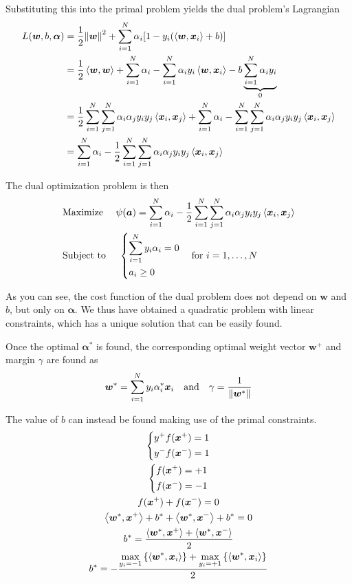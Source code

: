 \documentclass[oneside,onecolumn]{report}
\newcommand{\inp}[2]{\left\langle #1, #2 \right\rangle}
\begin{document}
Substituting this into the primal problem yields the dual problem's Lagrangian
\begin{align*}
    L(\bm w, b, \bm \alpha)
    &= \frac{1}{2} \norm{\bm w}^2 + \sum_{i = 1}^N \alpha_i [1 - y_i (\inp{\bm w}{\bm x_i} + b)] \\
    &= \frac{1}{2} \inp{\bm w}{\bm w} + \sum_{i = 1}^N \alpha_i - \sum_{i = 1}^N \alpha_i y_i \inp{\bm w}{\bm x_i} - b \underbrace{\sum_{i = 1}^N \alpha_i y_i}_0 \\
    &= \frac{1}{2} \sum_{i = 1}^N \sum_{j = 1}^N \alpha_i \alpha_j y_i y_j \inp{\bm x_i}{\bm x_j} + \sum_{i = 1}^N \alpha_i - \sum_{i = 1}^N \sum_{j = 1}^N \alpha_i \alpha_j y_i y_j \inp{\bm x_i}{\bm x_j} \\
    &= \sum_{i = 1}^N \alpha_i - \frac{1}{2} \sum_{i = 1}^N \sum_{j = 1}^N \alpha_i \alpha_j y_i y_j \inp{\bm x_i}{\bm x_j}
\end{align*}

The dual optimization problem is then
\begin{align*}
    &\text{Maximize   } \quad \psi(\bm a) = \sum_{i = 1}^N \alpha_i - \frac{1}{2} \sum_{i = 1}^N \sum_{j = 1}^N \alpha_i \alpha_j y_i y_j \inp{\bm x_i}{\bm x_j} \\
    &\text{Subject to } \quad \begin{dcases}
    \sum_{i = 1}^N y_i \alpha_i = 0 \\
    a_i \geq 0
\end{dcases} \quad \text{for } i = 1, \dots, N
\end{align*}

As you can see, the cost function of the dual problem does not depend on $\bm w$ and $b$, but only on $\bm \alpha$.
We thus have obtained a quadratic problem with linear constraints, which has a unique solution that can be easily found.

Once the optimal $\bm \alpha^*$ is found, the corresponding optimal weight vector $\bm w^+$ and margin $\gamma$ are found as
$$ \bm w^* = \sum_{i = 1}^N y_i \alpha_i^* \bm x_i \quad \text{and} \quad \gamma = \frac{1}{\norm{\bm w^*}}$$

The value of $b$ can instead be found making use of the primal constraints.
\begin{gather*}
    \begin{dcases}
        y^+ f(\bm x^+) = 1 \\
        y^- f(\bm x^-) = 1
    \end{dcases} \\
    \begin{dcases}
        f(\bm x^+) = +1 \\
        f(\bm x^-) = -1
    \end{dcases} \\
    f(\bm x^+) + f(\bm x^-) = 0 \\
    \inp{\bm w^*}{\bm x^+} + b^* + \inp{\bm w^*}{\bm x^-} + b^* = 0 \\
    b^* = \frac{\inp{\bm w^*}{\bm x^+} + \inp{\bm w^*}{\bm x^-}}{2} \\
    b^* = - \frac{\displaystyle \max_{y_i = -1} \left \{ \inp{\bm w^*}{\bm x_i} \right \} + \max_{y_i = + 1} \left \{ \inp{\bm w^*}{\bm x_i} \right \}}{2}
\end{gather*}
\end{document}
